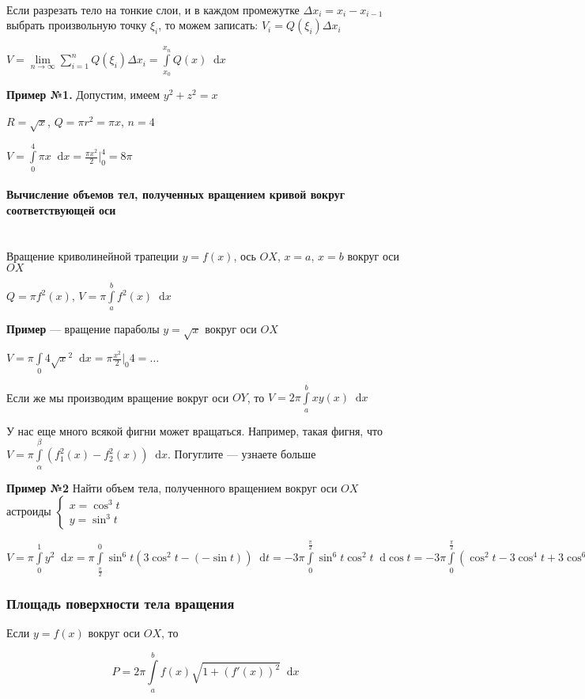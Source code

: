 \documentclass{article}
\newcommand*\diff{\mathop{}\!\mathrm{d}}
\begin{document}
\hfill \\[2mm]

Если разрезать тело на тонкие слои, и в каждом промежутке $\Delta x_i = x_i - x_{i - 1}$ выбрать произвольную точку $\xi_i$, то можем записать: $V_i = Q(\xi_i) \Delta x_i$

$V = \lim\limits_{n \to \infty} \sum\limits_{i = 1}^{n} Q(\xi_i) \Delta x_i = \int\limits_{x_0}^{x_{n}} Q(x) \diff x$

\hfill

\textbf{Пример №1.} Допустим, имеем $y^2 + z^2 = x$

$R = \sqrt{x}$, $Q = \pi r^2 = \pi x$, $n = 4$

$V = \int\limits_{0}^{4} \pi x \diff x = \frac{\pi x^2}{2} \bigg|_{0}^{4} = 8 \pi$

\paragraph{Вычисление объемов тел, полученных вращением кривой вокруг соответствующей оси}

\hfill \\[2mm]

Вращение криволинейной трапеции $y = f(x)$, ось $OX$, $x = a$, $x = b$ вокруг оси $OX$

$Q = \pi f^2(x)$, $V = \pi \int\limits_{a}^{b} f^2(x) \diff x$

\hfill

\textbf{Пример} — вращение параболы $y = \sqrt{x}$ вокруг оси $OX$

$V = \pi \int\limits_{0}{4} \sqrt{x}^2 \diff x = \pi \frac{x^2}{2} \bigg|_{0}{4} = \dots$ 

\hfill

Если же мы производим вращение вокруг оси $OY$, то $V = 2 \pi \int\limits_{a}^{b} x y(x) \diff x$

У нас еще много всякой фигни может вращаться. Например, такая фигня, что $V = \pi \int\limits_{\alpha}^{\beta} (f_1^2 (x) - f_2^2 (x)) \diff x$. Погуглите — узнаете больше

\hfill

\textbf{Пример №2} Найти объем тела, полученного вращением вокруг оси $OX$ астроиды $\begin{cases}
    x = \cos^3 t \\
    y = \sin^3 t
\end{cases}$

$V = \pi \int\limits_{0}^{1} y^2 \diff x = \pi \int\limits_{\frac{\pi}{2}}^{0} \sin^6 t (3 \cos^2 t - (-\sin t)) \diff t = -3 \pi \int\limits_{0}^{\frac{\pi}{2}} \sin^6 t \cos^2 t \diff \cos t = - 3 \pi \int\limits_{0}^{\frac{\pi}{2}} (\cos^2 t - 3 \cos^4 t + 3 \cos^6 t - \cos^8 t) \diff \cos t = -\frac{\cos^9 t}{9} - \frac{\cos^3 t}{3} - \frac{3\cos^5 t}{5} + \frac{3 \cos^7 t}{7} \bigg|_{0}^{\frac{\pi}{2}} = \dots$

\subsubsection{Площадь поверхности тела вращения}

Если $y = f(x)$ вокруг оси $OX$, то

$$P = 2 \pi \int\limits_{a}^{b} f(x) \sqrt{1 + (f'(x))^2} \diff x$$
\end{document}

